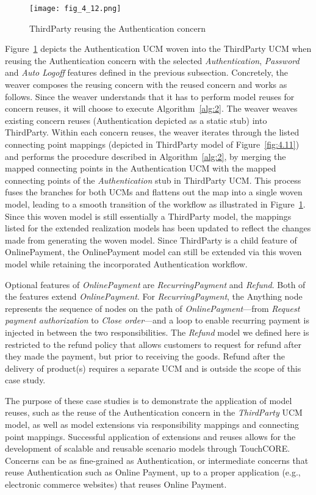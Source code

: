 \begin{figure}
	\centering
	\texttt{[image: fig\_4\_12.png]}
	\caption{ThirdParty reusing the Authentication concern}
	\label{fig:4.12}
\end{figure}

Figure~\ref{fig:4.12} depicts the Authentication UCM woven into the ThirdParty UCM when reusing the Authentication concern with the selected \emph{Authentication}, \emph{Password} and \emph{Auto Logoff} features defined in the previous subsection. Concretely, the weaver composes the reusing concern with the reused concern and works as follows. Since the weaver understands that it has to perform model reuses for concern reuses, it will choose to execute Algorithm~\ref{alg:2}. The weaver weaves existing concern reuses (Authentication depicted as a static stub) into ThirdParty. Within each concern reuses, the weaver iterates through the listed connecting point mappings (depicted in ThirdParty model of Figure~\ref{fig:4.11}) and performs the procedure described in Algorithm~\ref{alg:2}, by merging the mapped connecting points in the Authentication UCM with the mapped connecting points of the \emph{Authentication} stub in ThirdParty UCM. This process fuses the branches for both UCMs and flattens out the map into a single woven model, leading to a smooth transition of the workflow as illustrated in Figure~\ref{fig:4.12}. Since this woven model is still essentially a ThirdParty model, the mappings listed for the extended realization models has been updated to reflect the changes made from generating the woven model. Since ThirdParty is a child feature of OnlinePayment, the OnlinePayment model can still be extended via this woven model while retaining the incorporated Authentication workflow.

Optional features of \emph{OnlinePayment} are \emph{RecurringPayment} and \emph{Refund}. Both of the features extend \emph{OnlinePayment}. For \emph{RecurringPayment}, the {\cls Anything} node represents the sequence of nodes on the path of \emph{OnlinePayment}---from \emph{Request payment authorization} to \emph{Close order}---and a loop to enable recurring payment is injected in between the two responsibilities. The \emph{Refund} model we defined here is restricted to the refund policy that allows customers to request for refund after they made the payment, but prior to receiving the goods. Refund after the delivery of product(s) requires a separate UCM and is outside the scope of this case study.

The purpose of these case studies is to demonstrate the application of model reuses, such as the reuse of the Authentication concern in the \emph{ThirdParty} UCM model, as well as model extensions via responsibility mappings and connecting point mappings. Successful application of extensions and reuses allows for the development of scalable and reusable scenario models through TouchCORE. Concerns can be as fine-grained as Authentication, or intermediate concerns that reuse Authentication such as Online Payment, up to a proper application (e.g., electronic commerce websites) that reuses Online Payment.

